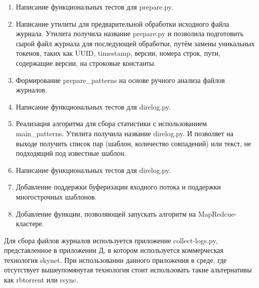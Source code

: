 \begin{enumerate}
\item Написание функциональных тестов для prepare.py.
\item Написание утилиты для предварительной обработки исходного файла журнала.
  Утилита получила название prepare.py и позволила подготовить сырой файл
  журнала для последующей обработки, путём замены уникальных токенов, таких
  как UUID, timestamp, версии, номера строк, пути, содержащие версии, на
  строковые константы.
\item Формирование prepare\_patterns на основе ручного анализа
  файлов журналов.
\item Написание функциональных тестов для direlog.py.
\item Реализация алгоритма для сбора статистики с использованием\\
  main\_patterns. Утилита получила название direlog.py. И позволяет на
  выходе получить список пар (шаблон, количество совпадений) или текст,
  не подходящий под известные шаблон.
\item Написание функциональных тестов для direlog.py.
\item Добавление поддержки буферизации входного потока и поддержки
  многострочных шаблонов.
\item Добавление функции, позволяющей запускать алгоритм на MapRedcue-кластере.
\end{enumerate}

Для сбора файлов журналов используется приложение collect-logs.py,
представленное в приложении Д, в котором используется коммерческая технология
skynet. При использовании данного приложения в среде, где отсутствует
вышеупомянутая технология стоит использовать такие альтернативы как rbtorrent
или rsync.


